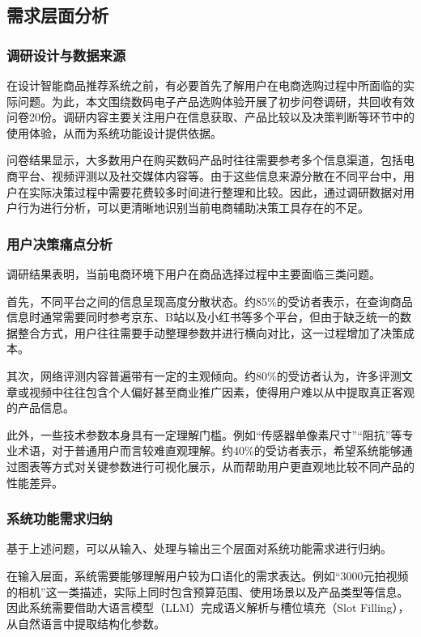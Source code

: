 \documentclass{nkuthesis}
\begin{document}
\subsection{需求层面分析}

\subsubsection{调研设计与数据来源}

在设计智能商品推荐系统之前，有必要首先了解用户在电商选购过程中所面临的实际问题。为此，本文围绕数码电子产品选购体验开展了初步问卷调研，共回收有效问卷20份。调研内容主要关注用户在信息获取、产品比较以及决策判断等环节中的使用体验，从而为系统功能设计提供依据。

问卷结果显示，大多数用户在购买数码产品时往往需要参考多个信息渠道，包括电商平台、视频评测以及社交媒体内容等。由于这些信息来源分散在不同平台中，用户在实际决策过程中需要花费较多时间进行整理和比较。因此，通过调研数据对用户行为进行分析，可以更清晰地识别当前电商辅助决策工具存在的不足。

\subsubsection{用户决策痛点分析}

调研结果表明，当前电商环境下用户在商品选择过程中主要面临三类问题。

首先，不同平台之间的信息呈现高度分散状态。约85\%的受访者表示，在查询商品信息时通常需要同时参考京东、B站以及小红书等多个平台，但由于缺乏统一的数据整合方式，用户往往需要手动整理参数并进行横向对比，这一过程增加了决策成本。

其次，网络评测内容普遍带有一定的主观倾向。约80\%的受访者认为，许多评测文章或视频中往往包含个人偏好甚至商业推广因素，使得用户难以从中提取真正客观的产品信息。

此外，一些技术参数本身具有一定理解门槛。例如“传感器单像素尺寸”“阻抗”等专业术语，对于普通用户而言较难直观理解。约40\%的受访者表示，希望系统能够通过图表等方式对关键参数进行可视化展示，从而帮助用户更直观地比较不同产品的性能差异。


\subsubsection{系统功能需求归纳}

基于上述问题，可以从输入、处理与输出三个层面对系统功能需求进行归纳。

在输入层面，系统需要能够理解用户较为口语化的需求表达。例如“3000元拍视频的相机”这一类描述，实际上同时包含预算范围、使用场景以及产品类型等信息。因此系统需要借助大语言模型（LLM）完成语义解析与槽位填充（Slot Filling），从自然语言中提取结构化参数。
\end{document}
